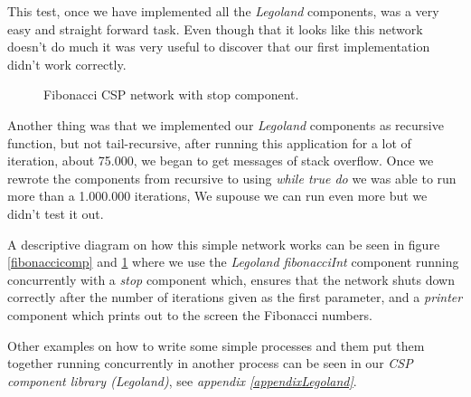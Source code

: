 \documentclass[a4paper,12pt]{article}
\begin{document}
This test, once we have implemented all the {\it Legoland}\cite{vintercsp}
components, was a very easy and straight forward task. Even though that it
looks like this network doesn't do much it was very useful to discover that
our first implementation didn't work correctly.

\begin{figure}[h]
  \begin{center}
  \end{center}
  \caption{Fibonacci CSP network with stop component.}
  \label{fibonacci}
\end{figure}

Another thing was that we implemented our {\it Legoland} components as
recursive function, but not tail-recursive, after running this application
for a lot of iteration, about 75.000, we began to get messages of stack
overflow. Once we rewrote the components from recursive to using {\it while true
do} we was able to run more than a 1.000.000 iterations, We supouse we can
run even more but we didn't test it out.

A descriptive diagram on how this simple network works can be seen in figure
\ref{fibonaccicomp} and \ref{fibonacci} where we use the {\it Legoland
fibonacciInt} component running concurrently with a {\it stop} component which,
ensures that the network shuts down correctly after the number of iterations
given as the first parameter, and a {\it printer} component which prints out to
the screen the Fibonacci numbers.

Other examples on how to write some simple processes and them put them together
running concurrently in another process can be seen in our {\it CSP component 
library (Legoland)}, see  {\it appendix \ref{appendixLegoland}}.
\end{document}
